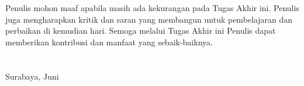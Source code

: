 Penulis mohon maaf apabila masih ada kekurangan pada Tugas Akhir ini. Penulis juga mengharapkan kritik dan saran yang membangun untuk pembelajaran dan perbaikan di kemudian hari. Semoga melalui Tugas Akhir ini Penulis dapat memberikan kontribusi dan manfaat yang sebaik-baiknya. \\ \\ \\

\hfill Surabaya, Juni \tahun \\ \\ \\

\hfill \penulis \\
\cleardoublepage
